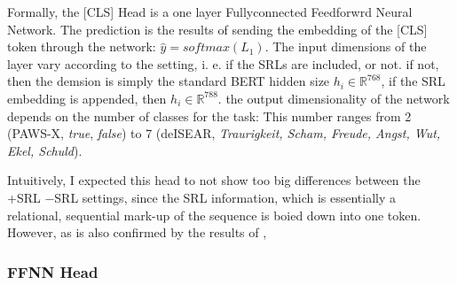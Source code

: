

Formally, the [CLS] Head is a one layer Fullyconnected Feedforwrd Neural Network. The
prediction is the results of sending the embedding of the [CLS] token through the network:
$\hat{y} = softmax(L_1)$. The input dimensions of the layer vary according to the setting,
i. e. if the SRLs are included, or not. if not, then the demsion is simply the standard
BERT hidden size $h_i \in \mathbb{R}^{768}$, if the SRL embedding is appended, then $h_i \in
\mathbb{R}^{788}$. the output dimensionality of the network depends on the number of classes
for the task: This number ranges from 2 (PAWS-X, \emph{true}, \emph{false}) to 7 (deISEAR,
\emph{Traurigkeit, Scham, Freude, Angst, Wut, Ekel, Schuld}).



Intuitively, I expected this head to not show too big differences between the +SRL $-$SRL settings,
since the SRL information, which is essentially a relational, sequential mark-up of the sequence is
boied down into one token. However, as is also confirmed by the results of \cite{zhang2019semantics},


\subsubsection{FFNN Head}

